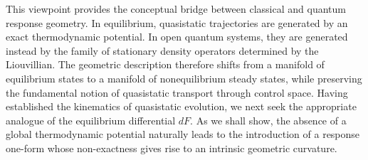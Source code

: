 This viewpoint provides the conceptual bridge between classical
and quantum response geometry. In equilibrium, quasistatic
trajectories are generated by an exact thermodynamic potential.
In open quantum systems, they are generated instead by the family
of stationary density operators determined by the Liouvillian.
The geometric description therefore shifts from a manifold of
equilibrium states to a manifold of nonequilibrium steady states,
while preserving the fundamental notion of quasistatic transport
through control space.
Having established the kinematics of quasistatic evolution, we
next seek the appropriate analogue of the equilibrium
differential \(dF\). As we shall show, the absence of a global
thermodynamic potential naturally leads to the introduction of a
response one-form whose non-exactness gives rise to an intrinsic
geometric curvature.


